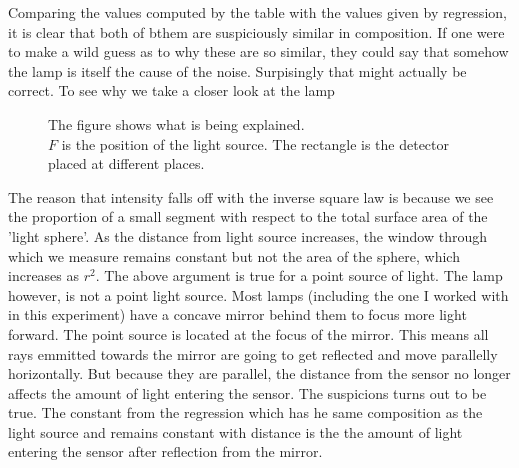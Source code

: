 \documentclass[12pt]{article}
\begin{document}
Comparing the values computed by the table with the values given by regression,
it is clear that both of bthem are suspiciously similar in composition.
If one were to make a wild guess as to why these are so similar, they could say that somehow the lamp is itself the cause of the noise.
Surpisingly that might actually be correct.
To see why we take a closer look at the lamp
\captionsetup[figure]{labelformat=empty}
\begin{figure}
    \centering
    \caption{The figure shows what is being explained. \\ $F$ is the position of the light source. The rectangle is the detector placed at different places.}
\end{figure}
\captionsetup[figure]{labelformat=default}

The reason that intensity falls off with the inverse square law is because we see the proportion of a small segment with respect to the total surface area of the 'light sphere'.
As the distance from light source increases,
the window through which we measure remains constant but not the area of the sphere, which increases as $r^2$.
The above argument is true for a point source of light.
The lamp however, is not a point light source.
Most lamps (including the one I worked with in this experiment) have a concave mirror behind them to focus more light forward.
The point source is located at the focus of the mirror.
This means all rays emmitted towards the mirror are going to get reflected and move parallelly horizontally.
But because they are parallel, the distance from the sensor no longer affects the amount of light entering the sensor.
The suspicions turns out to be true.
The constant from the regression which has he same composition as the light source and remains constant with distance is the the amount of light entering the sensor after reflection from the mirror.
\end{document}
